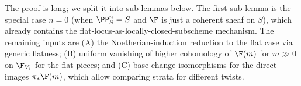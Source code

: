 The proof is long; we split it into sub-lemmas below.  The first sub-lemma is
the special case \(n = 0\) (when \(\PP^n_S = S\) and \(\F\) is just a coherent sheaf
on \(S\)), which already contains the flat-locus-as-locally-closed-subscheme
mechanism. The remaining inputs are (A) the Noetherian-induction reduction to
the flat case via generic flatness; (B) uniform vanishing of higher cohomology
of \(\F(m)\) for \(m \gg 0\) on \(\F_{V_i}\) for the flat pieces; and (C) base-change
isomorphisms for the direct images \(\pi_* \F(m)\), which allow comparing
strata for different twists.

\begin{lemma}
  \label{lem:flat_locus_open}


\end{lemma}

